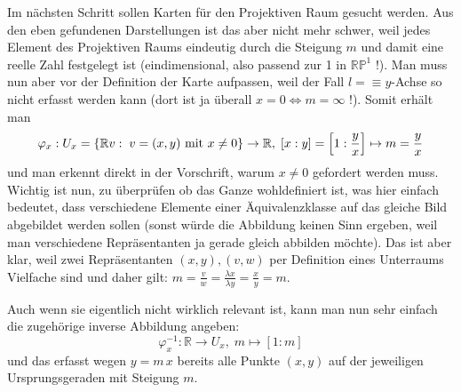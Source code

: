 \documentclass[../H_Analysis_main.tex]{subfiles}
\begin{document}
\begin{bsp}
Im nächsten Schritt sollen Karten für den Projektiven Raum gesucht werden. Aus den eben gefundenen Darstellungen ist das aber nicht mehr schwer, weil jedes Element des Projektiven Raums eindeutig durch die Steigung $m$ und damit eine reelle Zahl festgelegt ist (eindimensional, also passend zur 1 in $\mathbb{RP}^1$ !). Man muss nun aber vor der Definition der Karte aufpassen, weil der Fall $l =\equiv y$-Achse so nicht erfasst werden kann (dort ist ja überall $x = 0 \Leftrightarrow m = \infty$ !). Somit erhält man
\begin{equation}
\varphi_x: U_x = \qty{\mathbb{R} v: \; v = (x, y) \text{ mit } x \neq 0} \rightarrow \mathbb{R}, \; [x : y] = \qty[1 : \frac{y}{x}] \mapsto m = \frac{y}{x}
\end{equation}
und man erkennt direkt in der Vorschrift, warum $x \neq 0$ gefordert werden muss. Wichtig ist nun, zu überprüfen ob das Ganze wohldefiniert ist, was hier einfach bedeutet, dass verschiedene Elemente einer Äquivalenzklasse auf das gleiche Bild abgebildet werden sollen (sonst würde die Abbildung keinen Sinn ergeben, weil man verschiedene Repräsentanten ja gerade gleich abbilden möchte). Das ist aber klar, weil zwei Repräsentanten $(x, y), (v, w)$ per Definition eines Unterraums Vielfache sind und daher gilt: $m = \frac{v}{w} = \frac{\lambda x}{\lambda y} = \frac{x}{y} = m$.

Auch wenn sie eigentlich nicht wirklich relevant ist, kann man nun sehr einfach die zugehörige inverse Abbildung angeben:
\begin{equation}
\varphi_x^{-1}: \mathbb{R} \rightarrow U_x, \; m \mapsto [1 : m]
\end{equation}
und das erfasst wegen $y = m \, x$ bereits alle Punkte $(x, y)$ auf der jeweiligen Ursprungsgeraden mit Steigung $m$.



\end{bsp}
\end{document}
